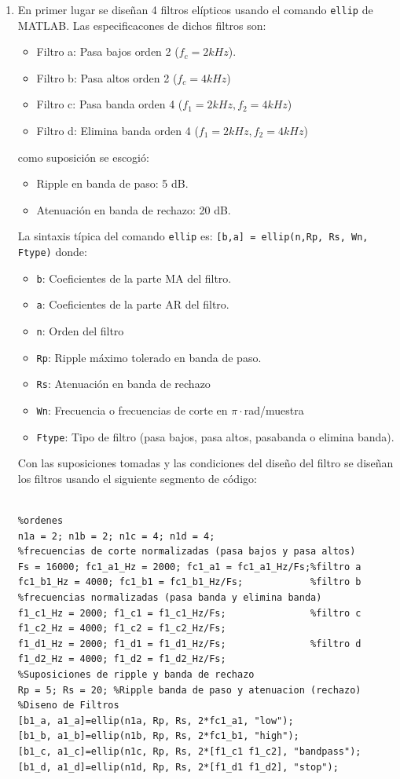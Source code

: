 \begin{enumerate}
\item En primer lugar se diseñan 4 filtros elípticos usando el comando \texttt{ellip} de MATLAB. Las especificacones de dichos filtros son:
\begin{itemize}
    \item Filtro a: Pasa bajos orden 2 ($f_c = 2 kHz$).
    \item Filtro b: Pasa altos orden 2 ($f_c = 4 kHz$)
    \item Filtro c: Pasa banda orden 4 ($f_1 = 2 kHz, f_2 = 4 kHz$)
    \item Filtro d: Elimina banda orden 4 ($f_1 = 2 kHz, f_2 = 4 kHz$)
\end{itemize}
como suposición se escogió:
\begin{itemize}
    \item Ripple en banda de paso: 5 dB.
    \item Atenuación en banda de rechazo: 20 dB.
\end{itemize}

La sintaxis típica del comando \texttt{ellip} es: \texttt{[b,a] = ellip(n,Rp, Rs, Wn, Ftype)} donde:
\begin{itemize}
    \item \texttt{b}: Coeficientes de la parte MA del filtro.
    \item \texttt{a}: Coeficientes de la parte AR del filtro.
    \item \texttt{n}: Orden del filtro
    \item \texttt{Rp}: Ripple máximo tolerado en banda de paso.
    \item \texttt{Rs}: Atenuación en banda de rechazo
    \item \texttt{Wn}: Frecuencia o frecuencias de corte en $\pi\cdot$rad/muestra
    \item \texttt{Ftype}: Tipo de filtro (pasa bajos, pasa altos, pasabanda o elimina banda).
\end{itemize}

Con las suposiciones tomadas y las condiciones del diseño del filtro se diseñan los filtros usando el siguiente segmento de código:
\begin{lstlisting}[frame=single]
%%% 1. Diseno de filtros IIR usando ellip

%ordenes
n1a = 2; n1b = 2; n1c = 4; n1d = 4;
%frecuencias de corte normalizadas (pasa bajos y pasa altos)
Fs = 16000; fc1_a1_Hz = 2000; fc1_a1 = fc1_a1_Hz/Fs;%filtro a
fc1_b1_Hz = 4000; fc1_b1 = fc1_b1_Hz/Fs;            %filtro b
%frecuencias normalizadas (pasa banda y elimina banda)
f1_c1_Hz = 2000; f1_c1 = f1_c1_Hz/Fs;               %filtro c
f1_c2_Hz = 4000; f1_c2 = f1_c2_Hz/Fs;
f1_d1_Hz = 2000; f1_d1 = f1_d1_Hz/Fs;               %filtro d
f1_d2_Hz = 4000; f1_d2 = f1_d2_Hz/Fs;
%Suposiciones de ripple y banda de rechazo
Rp = 5; Rs = 20; %Ripple banda de paso y atenuacion (rechazo)  
%Diseno de Filtros 
[b1_a, a1_a]=ellip(n1a, Rp, Rs, 2*fc1_a1, "low");
[b1_b, a1_b]=ellip(n1b, Rp, Rs, 2*fc1_b1, "high");
[b1_c, a1_c]=ellip(n1c, Rp, Rs, 2*[f1_c1 f1_c2], "bandpass");
[b1_d, a1_d]=ellip(n1d, Rp, Rs, 2*[f1_d1 f1_d2], "stop");
\end{lstlisting}


\end{enumerate}
